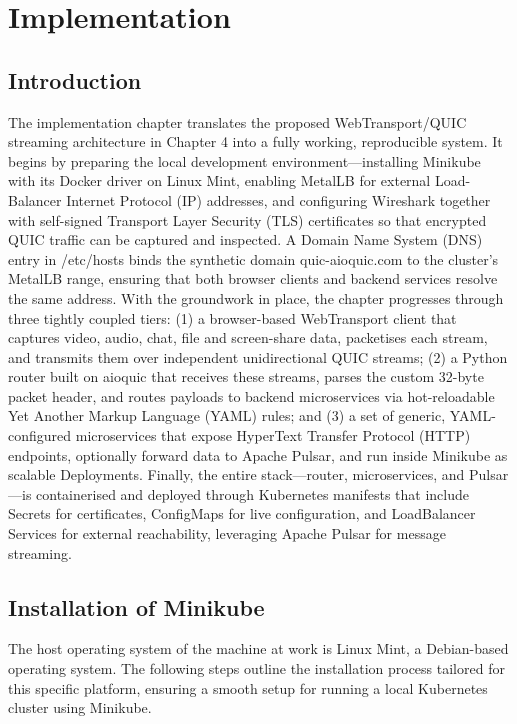 \chapter{Implementation}

\section{Introduction}
The implementation chapter translates the proposed WebTransport/QUIC streaming architecture in Chapter 4 into a fully working, reproducible system. It begins by preparing the local development environment—installing Minikube \cite{minikube-docs} with its Docker driver on Linux Mint, enabling MetalLB \cite{metallb-docs} for external Load-Balancer Internet Protocol (IP) addresses, and configuring Wireshark \cite{wireshark-docs} together with self-signed Transport Layer Security (TLS) certificates so that encrypted QUIC traffic can be captured and inspected. A Domain Name System (DNS) entry in /etc/hosts binds the synthetic domain quic-aioquic.com to the cluster’s MetalLB range, ensuring that both browser clients and backend services resolve the same address. With the groundwork in place, the chapter progresses through three tightly coupled tiers: (1) a browser-based WebTransport client that captures video, audio, chat, file and screen-share data, packetises each stream, and transmits them over independent unidirectional QUIC streams; (2) a Python router built on aioquic \cite{aioquic-repo} that receives these streams, parses the custom 32-byte packet header, and routes payloads to backend microservices via hot-reloadable Yet Another Markup Language (YAML) rules; and (3) a set of generic, YAML-configured microservices that expose HyperText Transfer Protocol (HTTP) endpoints, optionally forward data to Apache Pulsar, and run inside Minikube as scalable Deployments. Finally, the entire stack—router, microservices, and Pulsar—is containerised and deployed through Kubernetes manifests that include Secrets for certificates, ConfigMaps for live configuration, and LoadBalancer Services for external reachability, leveraging Apache Pulsar \cite{pulsar-helm-repo} for message streaming.


\section{Installation of Minikube}
The host operating system of the machine at work is Linux Mint, a Debian-based operating system. The following steps outline the installation process tailored for this specific platform, ensuring a smooth setup for running a local Kubernetes cluster using Minikube.

